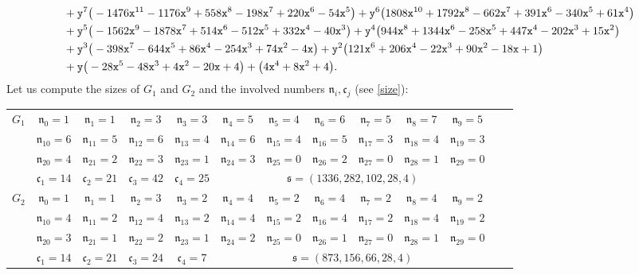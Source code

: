 \documentclass[11pt,a4paper]{amsart}
\theoremstyle{definition}
\theoremstyle{remark}
\newenvironment{stepsb}{%
\refstepcounter{theor}\noindent{\bf (\thetheor)\ }\ }%
{\em}
\newcommand{\x}{{\tt x}} \newcommand{\y}{{\tt y}}
\begin{document}
\begin{stepsb}
{\begin{align*}
&+\y^{7}\big(-1476\x^{11}-1176\x^{9}+558\x^{8}-198\x^{7}+220\x^{6}-54\x^{5}\big)+\y^{6}\big(1808\x^{10}+1792\x^{8}-662\x^{7}+391\x^{6}-340\x^{5}+61\x^{4}\big)\\
&+\y^{5}\big(-1562\x^{9}-1878\x^{7}+514\x^{6}-512\x^{5}+332\x^{4}-40\x^{3}\big)+\y^{4}\big(944\x^{8}+1344\x^{6}-258\x^{5}+447\x^{4}-202\x^{3}+15\x^{2}\big)\\
&+\y^{3}\big(-398\x^{7}-644\x^{5}+86\x^{4}-254\x^{3}+74\x^{2}-4\x\big)+\y^{2}\big(121\x^{6}+206\x^{4}-22\x^{3}+90\x^{2}-18\x+1\big)\\
&+\y\big(-28\x^{5}-48\x^{3}+4\x^{2}-20\x+4\big)+\big(4\x^{4}+8\x^{2}+4\big).
\end{align*}}
Let us compute the sizes of $G_1$ and $G_2$ and the involved numbers ${\mathfrak n}_i,{\mathfrak c}_j$ (see \ref{size}):
\begin{center}
{\Small
\renewcommand*{\arraystretch}{1.5}
\begin{tabular}{|c|c|c|c|c|c|c|c|c|c|c|c|c|}
\hline
\multirow{4}{*}{$G_1$}&${\mathfrak n}_0=1$&${\mathfrak n}_1=1$&${\mathfrak n}_2=3$&${\mathfrak n}_3=3$&${\mathfrak n}_4=5$&${\mathfrak n}_5=4$&${\mathfrak n}_6=6$&${\mathfrak n}_7=5$&${\mathfrak n}_8=7$&${\mathfrak n}_9=5$\\
\cline{2-11}
&${\mathfrak n}_{10}=6$&${\mathfrak n}_{11}=5$&${\mathfrak n}_{12}=6$&${\mathfrak n}_{13}=4$&${\mathfrak n}_{14}=6$&${\mathfrak n}_{15}=4$&${\mathfrak n}_{16}=5$&${\mathfrak n}_{17}=3$&${\mathfrak n}_{18}=4$&${\mathfrak n}_{19}=3$\\
\cline{2-11}
&${\mathfrak n}_{20}=4$&${\mathfrak n}_{21}=2$&${\mathfrak n}_{22}=3$&${\mathfrak n}_{23}=1$&${\mathfrak n}_{24}=3$&${\mathfrak n}_{25}=0$&${\mathfrak n}_{26}=2$&${\mathfrak n}_{27}=0$&${\mathfrak n}_{28}=1$&${\mathfrak n}_{29}=0$\\
\cline{2-11}
&${\mathfrak c}_1=14$&${\mathfrak c}_2=21$&${\mathfrak c}_3=42$&${\mathfrak c}_4=25$&\multicolumn{6}{|c|}{{\small${\mathfrak s}=(1336,282,102,28,4)$}}\\
\hline
\multirow{4}{*}{$G_2$}&${\mathfrak n}_0=1$&${\mathfrak n}_1=1$&${\mathfrak n}_2=3$&${\mathfrak n}_3=2$&${\mathfrak n}_4=4$&${\mathfrak n}_5=2$&${\mathfrak n}_6=4$&${\mathfrak n}_7=2$&${\mathfrak n}_8=4$&${\mathfrak n}_9=2$\\
\cline{2-11}
&${\mathfrak n}_{10}=4$&${\mathfrak n}_{11}=2$&${\mathfrak n}_{12}=4$&${\mathfrak n}_{13}=2$&${\mathfrak n}_{14}=4$&${\mathfrak n}_{15}=2$&${\mathfrak n}_{16}=4$&${\mathfrak n}_{17}=2$&${\mathfrak n}_{18}=4$&${\mathfrak n}_{19}=2$\\
\cline{2-11}
&${\mathfrak n}_{20}=3$&${\mathfrak n}_{21}=1$&${\mathfrak n}_{22}=2$&${\mathfrak n}_{23}=1$&${\mathfrak n}_{24}=2$&${\mathfrak n}_{25}=0$&${\mathfrak n}_{26}=1$&${\mathfrak n}_{27}=0$&${\mathfrak n}_{28}=1$&${\mathfrak n}_{29}=0$\\
\cline{2-11}
&${\mathfrak c}_1=14$&${\mathfrak c}_2=21$&${\mathfrak c}_3=24$&${\mathfrak c}_4=7$&\multicolumn{6}{|c|}{{\small${\mathfrak s}=(873,156,66,28,4)$}}\\
\hline
\end{tabular}}
\end{center}
\end{stepsb}
\end{document}
